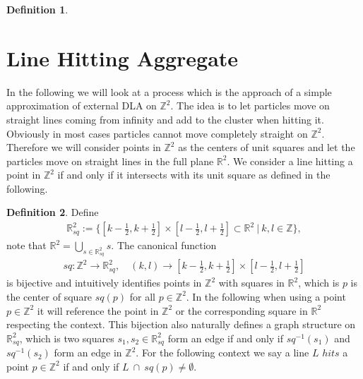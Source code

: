 \documentclass[12pt,a4paper]{scrartcl}
\numberwithin{equation}{subsection}
\newcommand{\1}{\mathbbm{1}}
\numberwithin{equation}{section}
\theoremstyle{definition}
\newtheorem{definition}{Definition}[subsection]
\begin{document}
\begin{definition}
	
\end{definition}

\newpage

\section{Line Hitting Aggregate}

In the following we will look at a process which is the approach of a simple approximation of external DLA on $\mathbb{Z}^2$. The idea is to let particles move on straight lines coming from infinity and add to the cluster when hitting it. Obviously in most cases particles cannot move completely straight on $\mathbb{Z}^2$. Therefore we will consider points in $\mathbb{Z}^2$ as the centers of unit squares and let the particles move on straight lines in the full plane $\mathbb{R}^2$. We consider a line hitting a point in $\mathbb{Z}^2$ if and only if it intersects with its unit square as defined in the following. 

\begin{definition}
	Define 
	\begin{align}
		\mathbb{R}^2_{sq} := \{[k - \frac{1}{2}, k + \frac{1}{2}] \times [l- \frac{1}{2}, l + \frac{1}{2}] \subset \mathbb{R}^2\ |\ k,l \in \mathbb{Z}\}, 
	\end{align} 
	note that $\mathbb{R}^2 = \bigcup_{s\in \mathbb{R}^2_{sq}} s$. The canonical function
	\begin{align}
	sq: \mathbb{Z}^2 \to \mathbb{R}^2_{sq},\quad (k,l)\to [k - \frac{1}{2}, k + \frac{1}{2}] \times [l- \frac{1}{2}, l + \frac{1}{2}]
	\end{align}
	is bijective and intuitively identifies points in $\mathbb{Z}^2$ with squares in $\mathbb{R}^2$, which is $p$ is the center of square $sq(p)$ for all $p\in \mathbb{Z}^2$. In the following when using a point $p\in \mathbb{Z}^2$ it will reference the point in $\mathbb{Z}^2$ or the corresponding square in $\mathbb{R}^2$ respecting the context. This bijection also naturally defines a graph structure on $\mathbb{R}^2_{sq}$, which is two squares $s_1, s_2\in \mathbb{R}^2_{sq}$ form an edge if and only if $sq^{-1}(s_1)$ and $sq^{-1}(s_2)$ form an edge in $\mathbb{Z}^2$. 
	\noindent For the following context we say a line $L$ $hits$ a point $p\in \mathbb{Z}^2$ if and only if $L\ \cap\ sq(p) \neq \emptyset$.
	
\end{definition}
\end{document}
